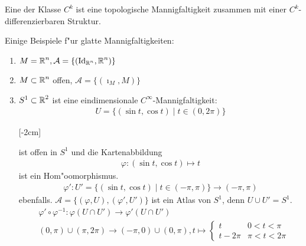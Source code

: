 \begin{dfn}
  Eine  der Klasse $C^k$ ist eine topologische Mannigfaltigkeit zusammen mit einer $C^{k}$-differenzierbaren Struktur.\\
\end{dfn}

\begin{bsp}
  Einige Beispiele f"ur glatte Mannigfaltigkeiten:
  \begin{enumerate}%
  \item $M = \operatorname{\mathbb{R}}^n, \mathcal A = \{(\operatorname{Id}_{\operatorname{\mathbb{R}}^n},\operatorname{\mathbb{R}}^n)\}$
  \item $M \subset \operatorname{\mathbb{R}}^n$ offen, $\mathcal A = \{(\imath_{M},M)\}$
  \item $S^1 \subset \operatorname{\mathbb{R}}^2$ ist eine eindimensionale $C^{\infty}$-Mannigfaltigkeit:
    \begin{align*}
      U = \{(\sin t, \cos t) \mid t \in (0,2\pi)\}
    \end{align*}

    [-2cm]

    ist offen in $S^1$ und die Kartenabbildung
    \begin{align*}
      \varphi \colon (\sin t, \cos t) \mapsto t
    \end{align*}
    ist ein Hom"oomorphismus.
    \begin{align*}
      \varphi' \colon U' = \{(\sin t, \cos t) \mid t \in (-\pi,\pi)\} \to (-\pi,\pi)
    \end{align*}
    ebenfalls. $\mathcal A = \{(\varphi, U), (\varphi',U')\}$ ist ein Atlas von $S^1$, denn $U \cup U' = S^1$.
    \begin{align*}
      & \varphi' \circ \varphi^{-1} \colon \varphi(U \cap U') \to \varphi'(U \cap U')\\
      & (0,\pi)\cup(\pi,2\pi) \to (-\pi,0)\cup(0,\pi), t \mapsto \begin{cases}
        t & 0 < t < \pi\\
        t-2\pi & \pi < t < 2\pi
      \end{cases}
    \end{align*}


\end{enumerate}
\end{bsp}
